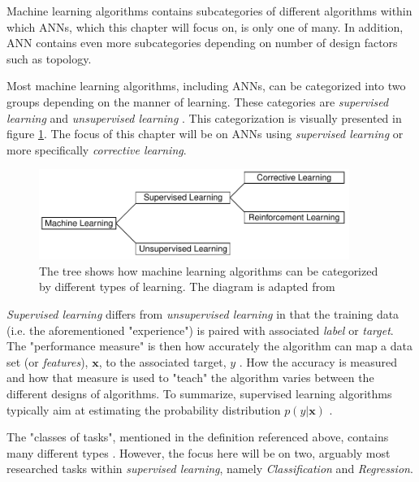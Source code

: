 Machine learning algorithms contains subcategories of different algorithms within which \acp{ANN}, which this chapter will focus on, is only one of many.
In addition, \ac{ANN} contains even more subcategories depending on number of design factors such as topology.

Most machine learning algorithms, including \acp{ANN}, can be categorized into two groups depending on the manner of learning.
These categories are \textit{supervised learning} and \textit{unsupervised learning} \cite{Goodfellow2016}.
This categorization is visually presented in figure \ref{fig:types-of-learning}.
The focus of this chapter will be on \acp{ANN} using \textit{supervised learning} or more specifically \textit{corrective learning}.

\begin{figure}[ht]
    \centering
    \includegraphics[width=0.9\textwidth]{img/types-of-learning-diagram.pdf}
    \caption{The tree shows how machine learning algorithms can be categorized by different types of learning. The diagram is adapted from \cite[Fig. 4.3]{Rojas1996a}}
    \label{fig:types-of-learning}
\end{figure}

\textit{Supervised learning} differs from \textit{unsupervised learning} in that the training data (i.e. the aforementioned "experience") is paired with associated \textit{label} or \textit{target}.
The "performance measure" is then how accurately the algorithm can map a data set (or \textit{features}), $\mathbf{x}$, to the associated target, $y$ \cite{Goodfellow2016}.
How the accuracy is measured and how that measure is used to "teach" the algorithm varies between the different designs of algorithms.
To summarize, supervised learning algorithms typically aim at estimating the probability distribution $p(y | \mathbf{x})$ \cite{Goodfellow2016}.

The "classes of tasks", mentioned in the definition referenced above, contains many different types \cite{Goodfellow2016}.
However, the focus here will be on two, arguably most researched tasks within \textit{supervised learning}, namely \textit{Classification} and \textit{Regression}.

